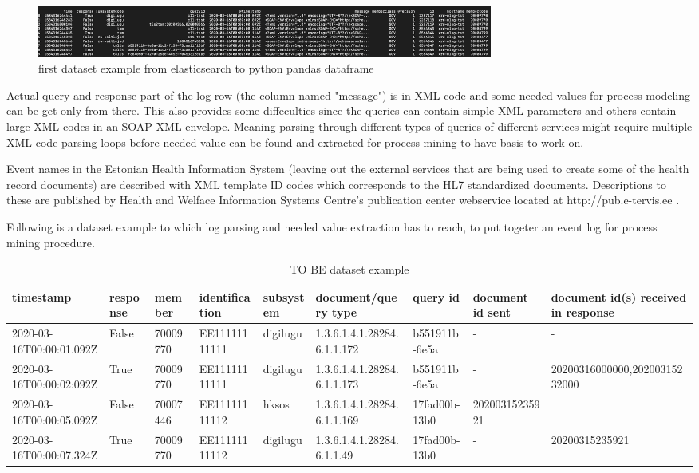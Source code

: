 \documentclass[a4paper, 12pt]{article}
\begin{document}
\begin{figure}[h]
	\centering
	\includegraphics[width=15cm]{img/first_dataset_example.png} %
	\caption{first dataset example from elasticsearch to python pandas dataframe}
	\label{fig:first dataset example}
\end{figure}

Actual query and response part of the log row (the column named "message") is in XML code and some needed values for process modeling can be get only from there. This also provides some diffeculties since the queries can contain simple XML parameters and others contain large XML codes in an SOAP XML envelope. Meaning parsing through different types of queries of different services might require multiple XML code parsing loops before needed value can be found and extracted for process mining to have basis to work on. 

 Event names in the Estonian Health Information System (leaving out the external services that are being used to create some of the health record documents) are described with XML template ID codes which corresponds to the HL7 standardized documents. Descriptions to these are published by Health and Welface Information Systems Centre's publication center webservice located at http://pub.e-tervis.ee . 

Following is a dataset example to which log parsing and needed value extraction has to reach, to put togeter an event log for process mining procedure. 

\begin{landscape}

\begin{table}[]
	\centering
	\small
	\begin{tabular}{lllllllll}
		\hline
		timestamp &
		response &
		member &
		identification &
		subsystem &
		document/query type &
		query id &
		document id sent &
		document id(s) received in response \\ \hline
		2020-03-16T00:00:01.092Z & False & 70009770 & EE11111111111 & digilugu & 1.3.6.1.4.1.28284.6.1.1.172 & b551911b-6e5a & -              & -              \\
		2020-03-16T00:00:02:092Z &
		True &
		70009770 &
		EE11111111111 &
		digilugu &
		1.3.6.1.4.1.28284.6.1.1.173 &
		b551911b-6e5a &
		- &
		20200316000000,20200315232000 \\
		2020-03-16T00:00:05.092Z & False & 70007446 & EE11111111112 & hksos    & 1.3.6.1.4.1.28284.6.1.1.169 & 17fad00b-13b0 & 20200315235921 &                \\
		2020-03-16T00:00:07.324Z & True  & 70009770 & EE11111111112 & digilugu & 1.3.6.1.4.1.28284.6.1.1.49  & 17fad00b-13b0 & -               & 20200315235921 \\ \hline
	\end{tabular}

	\caption{TO BE dataset example}
	\label{tab:dataset example}
\end{table}
\end{landscape}
\end{document}
